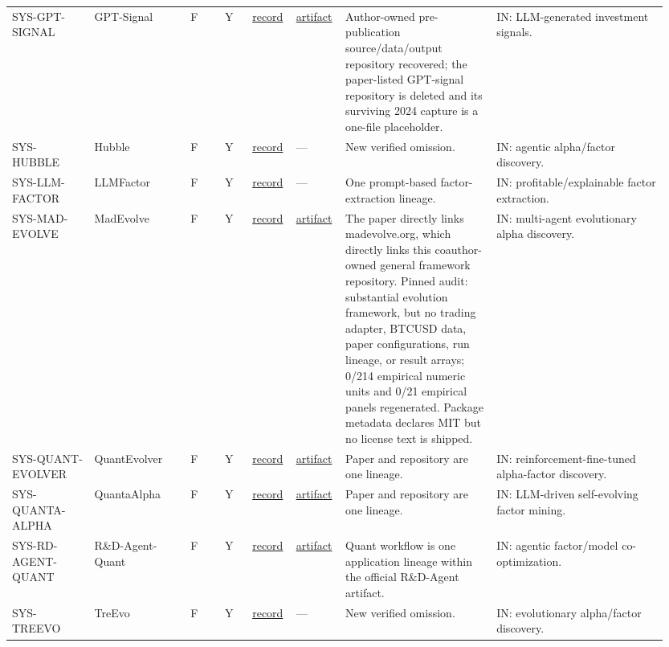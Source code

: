 \begin{longtable}{@{}L{0.12\linewidth}L{0.14\linewidth}L{0.05\linewidth}L{0.04\linewidth}L{0.06\linewidth}L{0.07\linewidth}L{0.22\linewidth}L{0.25\linewidth}@{}}
SYS-\allowbreak{}GPT-\allowbreak{}SIGNAL & GPT-Signal & F & Y & \href{https://arxiv.org/abs/2410.18448}{record} & \href{https://github.com/Yiningww/Thesis}{artifact} & Author-owned pre-publication source/data/output repository recovered; the paper-listed GPT-signal repository is deleted and its surviving 2024 capture is a one-file placeholder. & IN: LLM-generated investment signals. \\
SYS-\allowbreak{}HUBBLE & Hubble & F & Y & \href{https://arxiv.org/abs/2604.09601}{record} & --- & New verified omission. & IN: agentic alpha/factor discovery. \\
SYS-\allowbreak{}LLM-\allowbreak{}FACTOR & LLMFactor & F & Y & \href{https://arxiv.org/abs/2406.10811}{record} & --- & One prompt-based factor-extraction lineage. & IN: profitable/explainable factor extraction. \\
SYS-\allowbreak{}MAD-\allowbreak{}EVOLVE & MadEvolve & F & Y & \href{https://arxiv.org/abs/2605.23007}{record} & \href{https://github.com/tianyi-stack/MadEvolve}{artifact} & The paper directly links madevolve.org, which directly links this coauthor-owned general framework repository. Pinned audit: substantial evolution framework, but no trading adapter, BTCUSD data, paper configurations, run lineage, or result arrays; 0/214 empirical numeric units and 0/21 empirical panels regenerated. Package metadata declares MIT but no license text is shipped. & IN: multi-agent evolutionary alpha discovery. \\
SYS-\allowbreak{}QUANT-\allowbreak{}EVOLVER & QuantEvolver & F & Y & \href{https://arxiv.org/abs/2605.15412}{record} & \href{https://github.com/QuantLLM/QuantEvolver}{artifact} & Paper and repository are one lineage. & IN: reinforcement-fine-tuned alpha-factor discovery. \\
SYS-\allowbreak{}QUANTA-\allowbreak{}ALPHA & QuantaAlpha & F & Y & \href{https://arxiv.org/abs/2602.07085}{record} & \href{https://github.com/QuantaAlpha/QuantaAlpha}{artifact} & Paper and repository are one lineage. & IN: LLM-driven self-evolving factor mining. \\
SYS-\allowbreak{}RD-\allowbreak{}AGENT-\allowbreak{}QUANT & R\&D-Agent-Quant & F & Y & \href{https://aka.ms/RD-Agent-Tech-Report}{record} & \href{https://github.com/microsoft/RD-Agent}{artifact} & Quant workflow is one application lineage within the official R\&D-Agent artifact. & IN: agentic factor/model co-optimization. \\
SYS-\allowbreak{}TREEVO & TreEvo & F & Y & \href{https://arxiv.org/abs/2508.16334}{record} & --- & New verified omission. & IN: evolutionary alpha/factor discovery. \\

\end{longtable}
